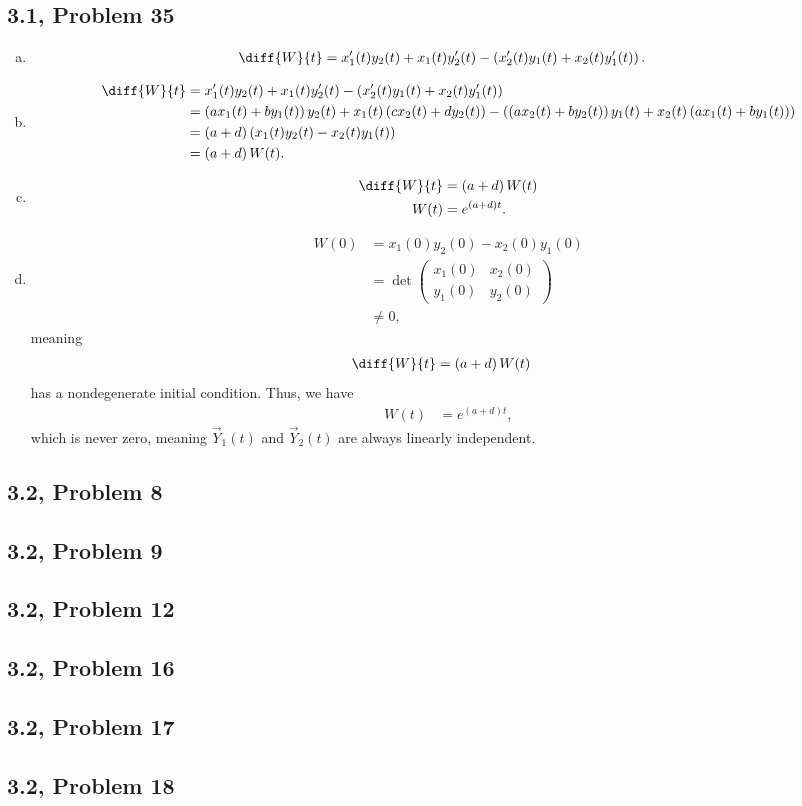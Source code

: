 \documentclass[10pt]{mypackage}
\begin{document}
\subsection{3.1, Problem 35}%
\begin{enumerate}[(a)]
  \item 
    \begin{align*}
      \diff{W}{t} &= x_1'(t)y_2(t) + x_1(t)y_2'(t) - \left(x_2'(t)y_1(t) + x_2(t)y_1'(t)\right).
    \end{align*}
  \item 
    \begin{align*}
      \diff{W}{t} &= x_1'(t)y_2(t) + x_1(t)y_2'(t) - \left(x_2'(t)y_1(t) + x_2(t)y_1'(t)\right)\\
                  &= \left(ax_1(t) + by_1(t)\right)y_2(t) + x_1(t)\left(cx_2(t) + dy_2(t)\right) - \left(\left(ax_2(t) + by_2(t)\right)y_1(t) + x_2(t)\left(ax_1(t) + by_1(t)\right)\right)\\
                  &= \left(a+d\right)\left(x_1(t)y_2(t) - x_2(t)y_1(t)\right)\\
                  &= \left(a+d\right)W(t).
    \end{align*}
  \item 
    \begin{align*}
      \diff{W}{t} &= \left(a+d\right)W(t)\\
      W(t)  &= e^{\left(a+d\right)t}.
    \end{align*}
  \item 
    \begin{align*}
      W(0) &= x_1(0)y_2(0) - x_2(0)y_1(0)\\
           &= \det \begin{pmatrix}x_1(0) & x_2(0) \\ y_1(0) & y_2(0)\end{pmatrix}\\
           &\neq 0,
    \end{align*}
    meaning
    \begin{align*}
      \diff{W}{t} &= \left(a+d\right)W(t)
    \end{align*}
    has a nondegenerate initial condition. Thus, we have
    \begin{align*}
      W(t) &= e^{\left(a+d\right)t},
    \end{align*}
    which is never zero, meaning $\vec{Y}_1(t)$ and $\vec{Y}_2(t)$ are always linearly independent.
\end{enumerate}
\subsection{3.2, Problem 8}%
\subsection{3.2, Problem 9}%
\subsection{3.2, Problem 12}%
\subsection{3.2, Problem 16}%
\subsection{3.2, Problem 17}%
\subsection{3.2, Problem 18}%
\end{document}
